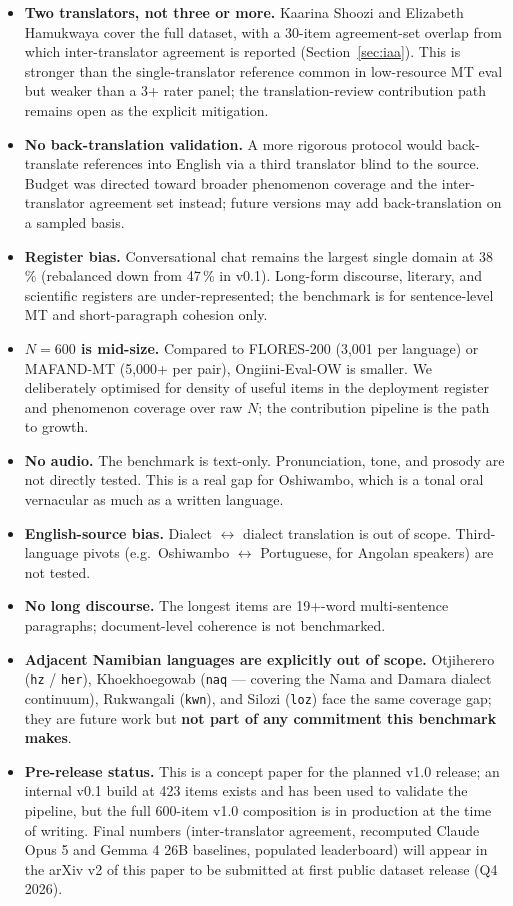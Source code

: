 \documentclass[11pt]{article}
\begin{document}
\begin{itemize}
\item \textbf{Two translators, not three or more.} Kaarina Shoozi
  and Elizabeth Hamukwaya cover the full dataset, with a 30-item
  agreement-set overlap from which inter-translator agreement is
  reported (Section~\ref{sec:iaa}). This is stronger than the
  single-translator reference common in low-resource MT eval but
  weaker than a 3+ rater panel; the translation-review
  contribution path remains open as the explicit mitigation.
\item \textbf{No back-translation validation.} A more rigorous
  protocol would back-translate references into English via a
  third translator blind to the source. Budget was directed toward
  broader phenomenon coverage and the inter-translator agreement
  set instead; future versions may add back-translation on a
  sampled basis.
\item \textbf{Register bias.} Conversational chat remains the
  largest single domain at 38\,\% (rebalanced down from 47\,\% in
  v0.1). Long-form discourse, literary, and scientific registers
  are under-represented; the benchmark is for sentence-level MT
  and short-paragraph cohesion only.
\item \textbf{$N = 600$ is mid-size.} Compared to FLORES-200
  \citep{costajussa2022nllb} (3,001 per language) or MAFAND-MT
  \citep{adelani2022mafand} (5,000+ per pair), Ongiini-Eval-OW is
  smaller. We deliberately optimised for density of useful items
  in the deployment register and phenomenon coverage over raw $N$;
  the contribution pipeline is the path to growth.
\item \textbf{No audio.} The benchmark is text-only. Pronunciation,
  tone, and prosody are not directly tested. This is a real gap
  for Oshiwambo, which is a tonal oral vernacular as much as a
  written language.
\item \textbf{English-source bias.} Dialect $\leftrightarrow$
  dialect translation is out of scope. Third-language pivots
  (e.g.\ Oshiwambo $\leftrightarrow$ Portuguese, for Angolan
  speakers) are not tested.
\item \textbf{No long discourse.} The longest items are 19+-word
  multi-sentence paragraphs; document-level coherence is not
  benchmarked.
\item \textbf{Adjacent Namibian languages are explicitly out of
  scope.} Otjiherero (\texttt{hz} / \texttt{her}), Khoekhoegowab
  (\texttt{naq} --- covering the Nama and Damara dialect
  continuum), Rukwangali (\texttt{kwn}), and Silozi (\texttt{loz})
  face the same coverage gap; they are future work but
  \textbf{not part of any commitment this benchmark makes}.
\item \textbf{Pre-release status.} This is a concept paper for the
  planned v1.0 release; an internal v0.1 build at 423 items exists
  and has been used to validate the pipeline, but the full
  600-item v1.0 composition is in production at the time of
  writing. Final numbers (inter-translator agreement, recomputed
  Claude Opus 5 and Gemma 4 26B baselines, populated leaderboard)
  will appear in the arXiv v2 of this paper to be submitted at
  first public dataset release (Q4 2026).
\end{itemize}
\end{document}
